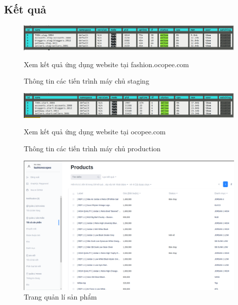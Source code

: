 \subsection{Kết quả}
\FloatBarrier
\begin{figure}[!htbp]\fontsize{13px}{13px}\selectfont
	\begin{center}	
		\includegraphics[width=\textwidth]{./results/vps-staging}
		\caption{Thông tin các tiến trình máy chủ staging}
	\end{center}
Xem kết quả ứng dụng website tại fashion.ocopee.com
\end{figure}
\FloatBarrier
\begin{figure}[!htbp]\fontsize{13px}{13px}\selectfont
	\begin{center}	
		\includegraphics[width=\textwidth]{./results/vps-production}
		\caption{Thông tin các tiến trình máy chủ production}
	\end{center}
Xem kết quả ứng dụng website tại ocopee.com
\end{figure}
\FloatBarrier
\begin{figure}[!htbp]\fontsize{13px}{13px}\selectfont
	\begin{center}	
		\includegraphics[width=\textwidth]{./results/product}
		\caption{Trang quản lí sản phẩm}
	\end{center}
\end{figure}
